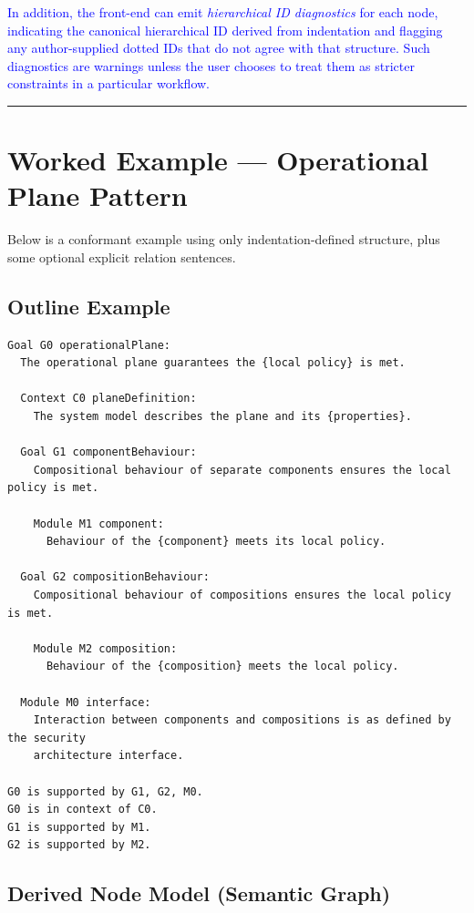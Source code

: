 \documentclass[11pt]{article}
\begin{document}
\textcolor{blue}{In addition, the front-end can emit \emph{hierarchical ID diagnostics} for each node, indicating the canonical hierarchical ID derived from indentation and flagging any author-supplied dotted IDs that do not agree with that structure. Such diagnostics are warnings unless the user chooses to treat them as stricter constraints in a particular workflow.}

\bigskip
\hrule
\bigskip

\section{Worked Example --- Operational Plane Pattern}

Below is a conformant example using only indentation-defined structure, plus some optional explicit relation sentences.

\subsection{Outline Example}

\begin{verbatim}
Goal G0 operationalPlane:
  The operational plane guarantees the {local policy} is met.

  Context C0 planeDefinition:
    The system model describes the plane and its {properties}.

  Goal G1 componentBehaviour:
    Compositional behaviour of separate components ensures the local policy is met.

    Module M1 component:
      Behaviour of the {component} meets its local policy.

  Goal G2 compositionBehaviour:
    Compositional behaviour of compositions ensures the local policy is met.

    Module M2 composition:
      Behaviour of the {composition} meets the local policy.

  Module M0 interface:
    Interaction between components and compositions is as defined by the security
    architecture interface.

G0 is supported by G1, G2, M0.
G0 is in context of C0.
G1 is supported by M1.
G2 is supported by M2.
\end{verbatim}

\subsection{Derived Node Model (Semantic Graph)}
\end{document}

